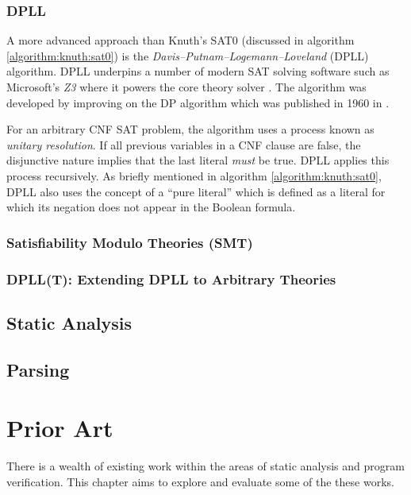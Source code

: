 \documentclass[a4paper,openany]{book}
\begin{document}
\subsection{DPLL}

A more advanced approach than Knuth's SAT0 (discussed in algorithm \ref{algorithm:knuth:sat0}) is the \emph{Davis–Putnam–Logemann–Loveland} (DPLL) algorithm. DPLL underpins a number of modern SAT solving software such as Microsoft's \emph{Z3} where it powers the core theory solver \citep{de2008z3}. The algorithm was developed by improving on the DP algorithm which was published in 1960 in \citet{Davis:1960:CPQ:321033.321034}.

For an arbitrary CNF SAT problem, the algorithm uses a process known as \emph{unitary resolution}. If all previous variables in a CNF clause are false, the disjunctive nature implies that the last literal \emph{must} be true. DPLL applies this process recursively. As briefly mentioned in algorithm \ref{algorithm:knuth:sat0}, DPLL also uses the concept of a ``pure literal'' which is defined as a literal for which its negation does not appear in the Boolean formula.



\subsection{Satisfiability Modulo Theories (SMT)}

\subsection{DPLL(T): Extending DPLL to Arbitrary Theories}

\section{Static Analysis}

\section{Parsing}

\chapter{Prior Art}

There is a wealth of existing work within the areas of static analysis and program verification. This chapter aims to explore and evaluate some of the these works.
\end{document}
